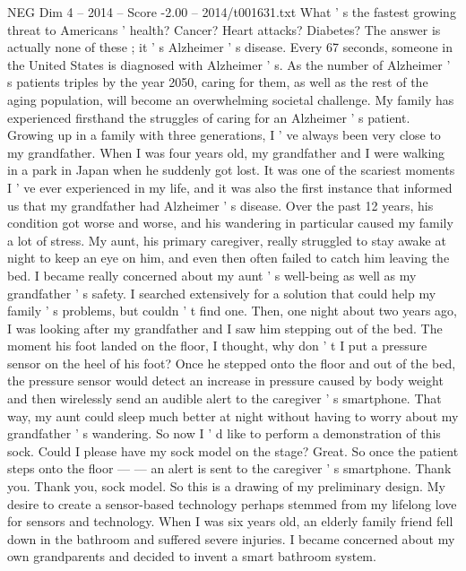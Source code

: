 \begin{textsample}{NEG Dim 4 – 2014 – Score -2.00 – 2014/t001631.txt}  \label{ex:f4_neg_014}
What ' s the fastest growing threat to Americans ' health?
Cancer?
Heart attacks?
Diabetes?
The answer is actually none of these ; it ' s Alzheimer ' s disease.
Every 67 seconds, someone in the United States is diagnosed with Alzheimer ' s.
As the number of Alzheimer ' s patients triples by the year 2050, caring for them, as well as the rest of the aging population, will become an overwhelming societal challenge.
My family has experienced firsthand the struggles of caring for an Alzheimer ' s patient.
Growing up in a family with three generations, I ' ve always been very close to my grandfather.
When I was four years old, my grandfather and I were walking in a park in Japan when he suddenly got lost.
It was one of the scariest moments I ' ve ever experienced in my life, and it was also the first instance that informed us that my grandfather had Alzheimer ' s disease.
Over the past 12 years, his condition got worse and worse, and his wandering in particular caused my family a lot of stress.
My aunt, his primary caregiver, really struggled to stay awake at night to keep an eye on him, and even then often failed to catch him leaving the bed.
I became really concerned about my aunt ' s well-being as well as my grandfather ' s safety.
I searched extensively for a solution that could help my family ' s problems, but couldn ' t find one.
Then, one night about two years ago, I was looking after my grandfather and I saw him stepping out of the bed.
The moment his foot landed on the floor, I thought, why don ' t I put a pressure sensor on the heel of his foot?
Once he stepped onto the floor and out of the bed, the pressure sensor would detect an increase in pressure caused by body weight and then wirelessly send an audible alert to the caregiver ' s smartphone.
That way, my aunt could sleep much better at night without having to worry about my grandfather ' s wandering.
So now I ' d like to perform a demonstration of this sock.
Could I please have my sock model on the stage?
Great.
So once the patient steps onto the floor — — an alert is sent to the caregiver ' s smartphone.
Thank you.
Thank you, sock model.
So this is a drawing of my preliminary design.
My desire to create a sensor-based technology perhaps stemmed from my lifelong love for sensors and technology.
When I was six years old, an elderly family friend fell down in the bathroom and suffered severe injuries.
I became concerned about my own grandparents and decided to invent a smart bathroom system.

\end{textsample}
